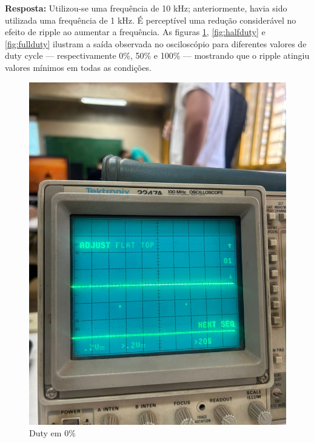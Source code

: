 \documentclass{article}
\begin{document}
\noindent
\textbf{Resposta:} Utilizou-se uma frequência de 10 kHz; anteriormente, havia sido utilizada uma frequência de 1 kHz. É perceptível uma redução considerável no efeito de ripple ao aumentar a frequência. As figuras \ref{fig:lowduty}, \ref{fig:halfduty} e \ref{fig:fullduty} ilustram a saída observada no osciloscópio para diferentes valores de duty cycle — respectivamente 0\%, 50\% e 100\% — mostrando que o ripple atingiu valores mínimos em todas as condições.

\begin{figure}
    \centering
    \includegraphics[width=0.9\linewidth]{low_duty.jpeg}
    \caption{Duty em 0\%}
    \label{fig:lowduty}
\end{figure}
\end{document}
